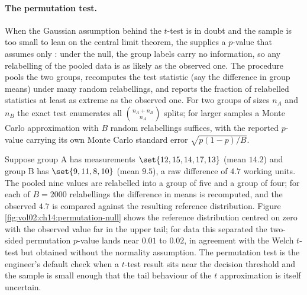 \paragraph{The permutation test.} When the Gaussian assumption
behind the $t$-test is in doubt and the sample is too small to lean
on the central limit theorem, the 
supplies a $p$-value that assumes only :
under the null, the group labels carry no information, so any
relabelling of the pooled data is as likely as the observed one.
The procedure pools the two groups, recomputes the test statistic
(say the difference in group means) under many random relabellings,
and reports the fraction of relabelled statistics at least as
extreme as the observed one. For two groups of sizes $n_{A}$ and
$n_{B}$ the exact test enumerates all $\binom{n_{A}+n_{B}}{n_{A}}$
splits; for larger samples a Monte Carlo approximation with $B$
random relabellings suffices, with the reported $p$-value carrying
its own Monte Carlo standard error $\sqrt{p(1-p)/B}$.

Suppose group A has measurements $\set{12, 15, 14, 17, 13}$ (mean
$14.2$) and group B has $\set{9, 11, 8, 10}$ (mean $9.5$), a raw
difference of $4.7$ working units. The pooled nine values are
relabelled into a group of five and a group of four; for each of
$B = 2000$ relabellings the difference in means is recomputed, and
the observed $4.7$ is compared against the resulting reference
distribution. Figure \ref{fig:vol02:ch14:permutation-null} shows the
reference distribution centred on zero with the observed value far
in the upper tail; for data this separated the two-sided
permutation $p$-value lands near $0.01$ to $0.02$, in agreement with
the Welch $t$-test but obtained without the normality assumption.
The permutation test is the engineer's default check when a
$t$-test result sits near the decision threshold and the sample is
small enough that the tail behaviour of the $t$ approximation is
itself uncertain.



